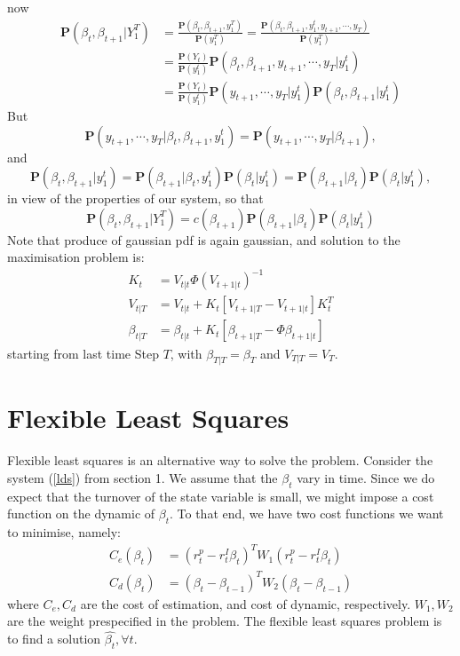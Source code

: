 \documentclass{article}
\theoremstyle{plain}
\theoremstyle{definition}
\theoremstyle{remark}
\newcommand{\PP}{\mathbf{P}}
\begin{document}
now
\begin{equation*}
\begin{split}
\PP(\beta_t, \beta_{t+1}|Y_1^T) &= \frac{\PP(\beta_t, \beta_{t+1}, y_1^T)}{\PP(y_1^T)} = \frac{\PP(\beta_t, \beta_{t+1}, y_1^t, y_{t+1}, \cdots, y_T)}{\PP(y_1^T)}\\
&=\frac{\PP(Y_t)}{\PP(y_1^t)} \PP(\beta_t, \beta_{t+1}, y_{t+1}, \cdots, y_T|y_1^t)\\
&=\frac{\PP(Y_t)}{\PP(y_1^t)} \PP(y_{t+1}, \cdots, y_T|y_1^t)\PP(\beta_t, \beta_{t+1}|y_1^t)
\end{split}
\end{equation*}
But
\[
\PP(y_{t+1}, \cdots, y_T | \beta_{t}, \beta_{t+1}, y_1^t) = \PP(y_{t+1}, \cdots, y_T | \beta_{t+1}),
\]
and
\[
\PP(\beta_t, \beta_{t+1}| y_1^t) =\PP( \beta_{t+1}|\beta_t, y_1^t)  \PP( \beta_t |y_1^t) = \PP( \beta_{t+1}|\beta_t)  \PP( \beta_t |y_1^t),
\]
in view of the properties of our system, so that 
\begin{equation}
\PP(\beta_t, \beta_{t+1}|Y_1^T) = c(\beta_{t+1}) \PP( \beta_{t+1}|\beta_t)  \PP( \beta_t |y_1^t)
\end{equation}
Note that produce of gaussian pdf is again gaussian, and solution to the maximisation problem is:
\begin{equation}
\begin{split}
K_t &= V_{t|t} \Phi ({V_{t+1|t} })^{-1}\\
V_{t|T} &= V_{t|t} + K_t [ V_{t+1|T} - V_{t+1|t}] K^T_t\\
\beta_{t|T} &= \beta_{t|t} + K_t [ \beta_{t+1|T} - \Phi \beta_{t+1|t}]
\end{split}
\end{equation}
starting from last time Step $T$, with $\beta_{T|T} = \beta_T$ and $V_{T|T} = V_{T}$.\section{Flexible Least Squares}

Flexible least squares is an alternative way to solve the problem. Consider the system (\ref{lds}) from section 1. We assume that the $\beta_t$ vary in time. Since we do expect that the turnover of the state variable is small, we might impose a cost function on the dynamic of $\beta_t$. To that end, we have two cost functions we want to minimise, namely:
\begin{equation}
\begin{split}
C_e(\beta_t) &= (r^p_t - r^I_t \beta_t)^T W_1 (r^p_t - r^I_t \beta_t)\\
C_d(\beta_t) &= (\beta_{t} - \beta_{t-1} )^T W_2 (\beta_{t} - \beta_{t-1} )
\end{split}
\end{equation}
where $C_e, C_d$ are the cost of estimation, and cost of dynamic, respectively. $W_1, W_2$ are the weight prespecified in the problem. The flexible least squares problem is to find a solution $\hat{\beta_t}, \forall t$. 
\end{document}
